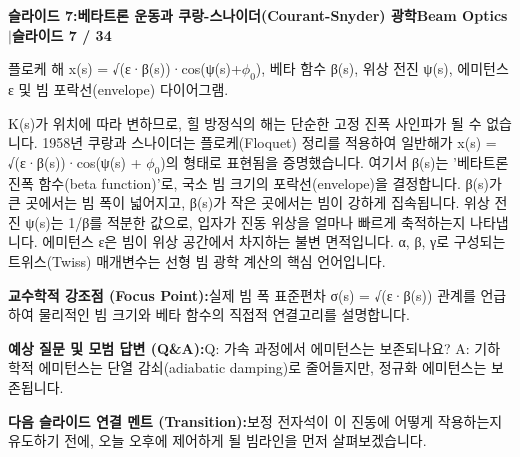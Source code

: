 \documentclass[11pt,a4paper]{article}
\begin{document}
\clearpage
\hypertarget{slide.7}{}
{}
\noindent\begin{tcolorbox}[colback=navy,colframe=navy,left=6pt,right=6pt,top=3pt,bottom=3pt,boxrule=0pt,arc=2pt]
{\large\bfseries\color{white}슬라이드 7:\enspace 베타트론 운동과 쿠랑-스나이더(Courant-Snyder) 광학}\hfill{\footnotesize\bfseries\color{white!85!lightbg}Beam Optics \enspace$|$\enspace 슬라이드 7 / 34}
\end{tcolorbox}
\vspace{0.2em}
\begin{tcolorbox}[colback=lightbg,colframe=bordergray,title={\footnotesize\bfseries\color{darkgray}슬라이드 시각 구성 요약},fontupper=\small,left=6pt,right=6pt,top=2.5pt,bottom=2.5pt,boxrule=0.6pt,arc=2.5pt]
플로케 해 x(s) = √(ε·β(s))·cos(ψ(s)+$\phi_0$), 베타 함수 β(s), 위상 전진 ψ(s), 에미턴스 ε 및 빔 포락선(envelope) 다이어그램.
\end{tcolorbox}
\vspace{0.2em}
\begin{tcolorbox}[colback=white,colframe=primaryblue,title={\footnotesize\bfseries\color{white}발표자 구두 대본 (Spoken Script)},fontupper=\small,left=6pt,right=6pt,top=3pt,bottom=3pt,boxrule=0.8pt,arc=2.5pt]
K(s)가 위치에 따라 변하므로, 힐 방정식의 해는 단순한 고정 진폭 사인파가 될 수 없습니다. 1958년 쿠랑과 스나이더는 플로케(Floquet) 정리를 적용하여 일반해가 x(s) = √(ε·β(s))·cos(ψ(s) + $\phi_0$)의 형태로 표현됨을 증명했습니다. 여기서 β(s)는 '베타트론 진폭 함수(beta function)'로, 국소 빔 크기의 포락선(envelope)을 결정합니다. β(s)가 큰 곳에서는 빔 폭이 넓어지고, β(s)가 작은 곳에서는 빔이 강하게 집속됩니다. 위상 전진 ψ(s)는 1/β를 적분한 값으로, 입자가 진동 위상을 얼마나 빠르게 축적하는지 나타냅니다. 에미턴스 ε은 빔이 위상 공간에서 차지하는 불변 면적입니다. α, β, γ로 구성되는 트위스(Twiss) 매개변수는 선형 빔 광학 계산의 핵심 언어입니다.
\end{tcolorbox}
\vspace{0.2em}
\begin{tcolorbox}[colback=lightbg,colframe=bordergray,left=6pt,right=6pt,top=3pt,bottom=3pt,boxrule=0.6pt,arc=2.5pt]
\small
\noindent\textbf{\color{navy}교수학적 강조점 (Focus Point):}\enspace 실제 빔 폭 표준편차 σ(s) = √(ε·β(s)) 관계를 언급하여 물리적인 빔 크기와 베타 함수의 직접적 연결고리를 설명합니다.\par\vspace{0.3em}
\noindent\textbf{\color{successgreen}예상 질문 및 모범 답변 (Q\&A):}\enspace Q: 가속 과정에서 에미턴스는 보존되나요? A: 기하학적 에미턴스는 단열 감쇠(adiabatic damping)로 줄어들지만, 정규화 에미턴스는 보존됩니다.\par\vspace{0.3em}
\noindent\textbf{\color{accent}다음 슬라이드 연결 멘트 (Transition):}\enspace 보정 전자석이 이 진동에 어떻게 작용하는지 유도하기 전에, 오늘 오후에 제어하게 될 빔라인을 먼저 살펴보겠습니다.
\end{tcolorbox}
\end{document}

